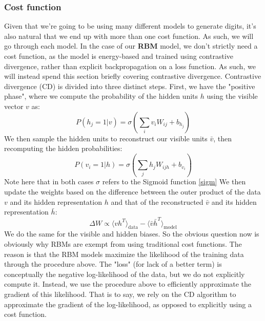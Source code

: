 \documentclass{article}
\begin{document}
\subsubsection{Cost function} \label{cost}
Given that we're going to be using many different models to generate digits, it's also natural that we end up with more than one cost function. As such, we will go through each model.
\newline
In the case of our \textbf{RBM} model, we don't strictly need a cost function, as the model is energy-based and trained using contrastive divergence, rather than explicit backpropagation on a loss function. As such, we will instead spend this section briefly covering contrastive divergence.
\newline
Contrastive divergence (CD) is divided into three distinct steps. First, we have the "positive phase", where we compute the probability of the hidden units $h$ using the visible vector $v$ as:
\begin{equation}
    P(h_j =1 |v) = \sigma\left( \sum_i v_i W_{ij} + b_{h_j} \right)
\end{equation}
We then sample the hidden units to reconstruct our visible units $\bar v$, then recomputing the hidden probabilities:
\begin{equation}
    P(v_i = 1 | h) = \sigma\left( \sum_j h_j W_{ijh} + b_{v_i} \right)
\end{equation}
Note here that in both cases $\sigma$ refers to the Sigmoid function \ref{sigm}
\newline
We then update the weights based on the difference between the outer product of the data $v$ and its hidden representation $h$ and that of the reconstructed $\bar v$ and its hidden representation $\bar h$:
\begin{equation}
    \Delta W \propto \langle v h^T \rangle_{\text{data}} - \langle \bar v \bar h^T \rangle_{\text{model}} 
\end{equation}
We do the same for the visible and hidden biases. \newline
So the obvious question now is obviously why RBMs are exempt from using traditional cost functions. The reason is that the RBM models maximize the likelihood of the training data through the procedure above. The "loss" (for lack of a better term) is conceptually the negative log-likelihood of the data, but we do not explicitly compute it. Instead, we use the procedure above to efficiently approximate the gradient of this likelihood. That is to say, we rely on the CD algorithm to approximate the gradient of the log-likelihood, as opposed to explicitly using a cost function.\newline
\end{document}
